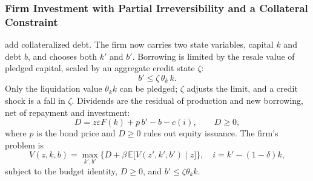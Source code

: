 \subsubsection{Firm Investment with Partial Irreversibility and a Collateral Constraint \citep{KhanThomas2013}}
\label{app:firm-investment-collateral}
\citet{KhanThomas2013} add collateralized debt. The firm now carries two state
variables, capital $k$ and debt $b$, and chooses both $k'$ and $b'$. Borrowing
is limited by the resale value of pledged capital, scaled by an aggregate credit
state $\zeta$:
\begin{equation}
    b' \le \zeta \, \theta_k \, k .
\end{equation}
Only the liquidation value $\theta_k k$ can be pledged; $\zeta$ adjusts the
limit, and a credit shock is a fall in $\zeta$. Dividends are the residual of
production and new borrowing, net of repayment and investment:
\begin{equation}
    D = z\varepsilon F(k) + p\, b' - b - c(i), \qquad D \ge 0,
\end{equation}
where $p$ is the bond price and $D \ge 0$ rules out equity issuance. The firm's
problem is
\begin{equation}
    V(z,k,b) = \max_{k',b'} \Big\{ D + \beta \, \mathbb{E}\big[V(z',k',b') \mid z\big] \Big\},
    \quad i = k' - (1-\delta)k,
\end{equation}
subject to the budget identity, $D \ge 0$, and $b' \le \zeta\theta_k k$.

